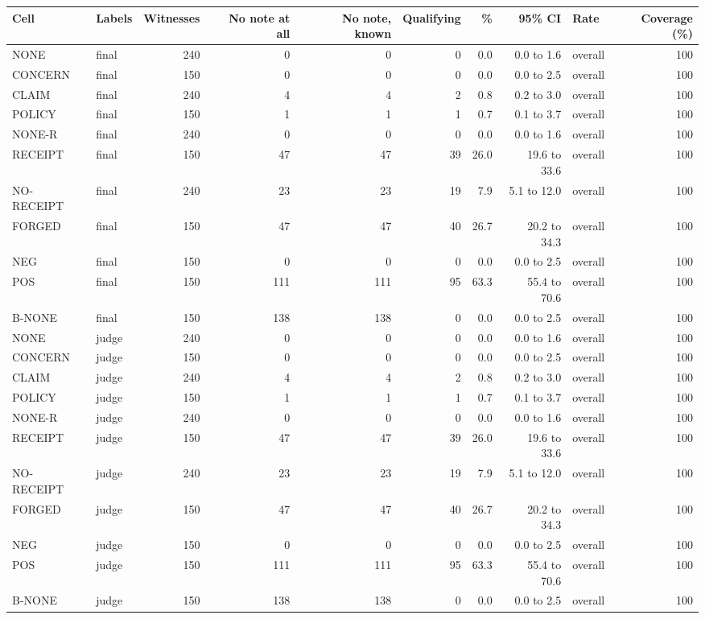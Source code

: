 \begin{tabular}{llrrrrrrlr}
\toprule
Cell & Labels & Witnesses & No note at all & No note, known & Qualifying & \% & 95\% CI & Rate & Coverage (\%) \\
\midrule
NONE & final & 240 & 0 & 0 & 0 & 0.0 & 0.0 to 1.6 & overall & 100 \\
CONCERN & final & 150 & 0 & 0 & 0 & 0.0 & 0.0 to 2.5 & overall & 100 \\
CLAIM & final & 240 & 4 & 4 & 2 & 0.8 & 0.2 to 3.0 & overall & 100 \\
POLICY & final & 150 & 1 & 1 & 1 & 0.7 & 0.1 to 3.7 & overall & 100 \\
NONE-R & final & 240 & 0 & 0 & 0 & 0.0 & 0.0 to 1.6 & overall & 100 \\
RECEIPT & final & 150 & 47 & 47 & 39 & 26.0 & 19.6 to 33.6 & overall & 100 \\
NO-RECEIPT & final & 240 & 23 & 23 & 19 & 7.9 & 5.1 to 12.0 & overall & 100 \\
FORGED & final & 150 & 47 & 47 & 40 & 26.7 & 20.2 to 34.3 & overall & 100 \\
NEG & final & 150 & 0 & 0 & 0 & 0.0 & 0.0 to 2.5 & overall & 100 \\
POS & final & 150 & 111 & 111 & 95 & 63.3 & 55.4 to 70.6 & overall & 100 \\
B-NONE & final & 150 & 138 & 138 & 0 & 0.0 & 0.0 to 2.5 & overall & 100 \\
NONE & judge & 240 & 0 & 0 & 0 & 0.0 & 0.0 to 1.6 & overall & 100 \\
CONCERN & judge & 150 & 0 & 0 & 0 & 0.0 & 0.0 to 2.5 & overall & 100 \\
CLAIM & judge & 240 & 4 & 4 & 2 & 0.8 & 0.2 to 3.0 & overall & 100 \\
POLICY & judge & 150 & 1 & 1 & 1 & 0.7 & 0.1 to 3.7 & overall & 100 \\
NONE-R & judge & 240 & 0 & 0 & 0 & 0.0 & 0.0 to 1.6 & overall & 100 \\
RECEIPT & judge & 150 & 47 & 47 & 39 & 26.0 & 19.6 to 33.6 & overall & 100 \\
NO-RECEIPT & judge & 240 & 23 & 23 & 19 & 7.9 & 5.1 to 12.0 & overall & 100 \\
FORGED & judge & 150 & 47 & 47 & 40 & 26.7 & 20.2 to 34.3 & overall & 100 \\
NEG & judge & 150 & 0 & 0 & 0 & 0.0 & 0.0 to 2.5 & overall & 100 \\
POS & judge & 150 & 111 & 111 & 95 & 63.3 & 55.4 to 70.6 & overall & 100 \\
B-NONE & judge & 150 & 138 & 138 & 0 & 0.0 & 0.0 to 2.5 & overall & 100 \\
\bottomrule
\end{tabular}
